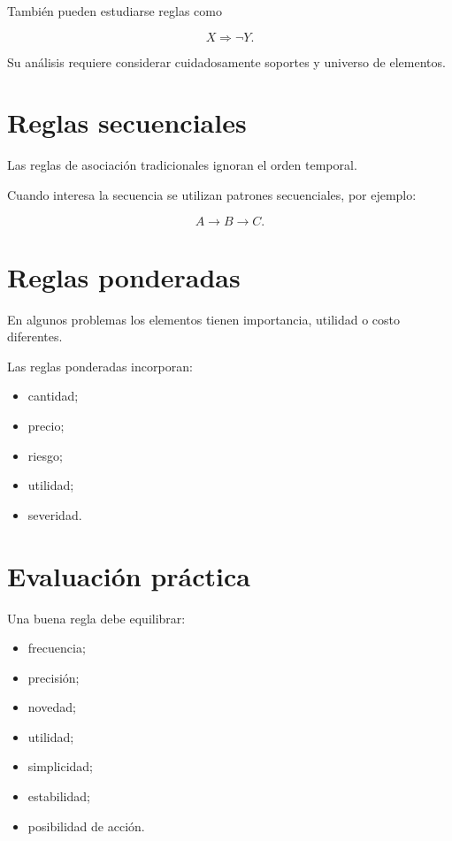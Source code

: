 \documentclass[
  spanish,
  10.5pt,
  letterpaper,
  DIV=11,
  numbers=noendperiod,
  oneside,
  open=any]{scrreprt}
\providecommand{\tightlist}{%
  \setlength{\itemsep}{0pt}\setlength{\parskip}{0pt}}
\theoremstyle{definition}
\theoremstyle{definition}
\theoremstyle{plain}
\theoremstyle{remark}
\begin{document}

También pueden estudiarse reglas como

\[
X\Rightarrow \neg Y.
\]

Su análisis requiere considerar cuidadosamente soportes y universo de
elementos.

\section*{Reglas secuenciales}\label{reglas-secuenciales}


Las reglas de asociación tradicionales ignoran el orden temporal.

Cuando interesa la secuencia se utilizan patrones secuenciales, por
ejemplo:

\[
A\to B\to C.
\]

\section*{Reglas ponderadas}\label{reglas-ponderadas}


En algunos problemas los elementos tienen importancia, utilidad o costo
diferentes.

Las reglas ponderadas incorporan:

\begin{itemize}
\tightlist
\item
  cantidad;
\item
  precio;
\item
  riesgo;
\item
  utilidad;
\item
  severidad.
\end{itemize}

\section*{Evaluación práctica}\label{evaluaciuxf3n-pruxe1ctica}


Una buena regla debe equilibrar:

\begin{itemize}
\tightlist
\item
  frecuencia;
\item
  precisión;
\item
  novedad;
\item
  utilidad;
\item
  simplicidad;
\item
  estabilidad;
\item
  posibilidad de acción.
\end{itemize}
\end{document}
